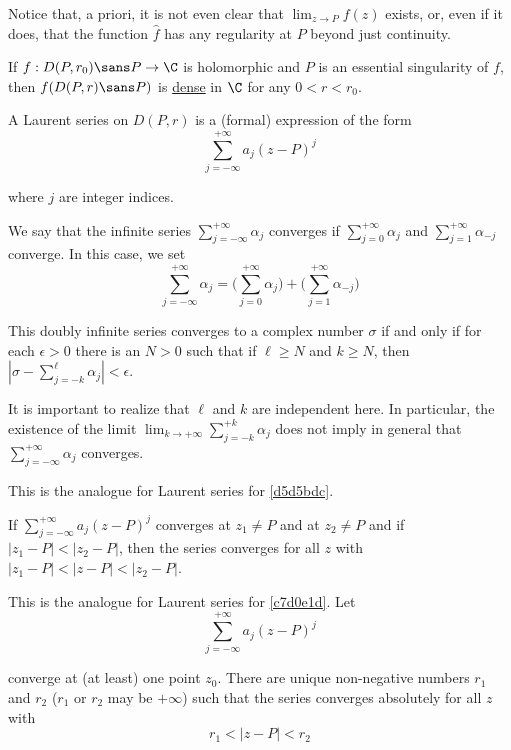 Notice that, a priori, it is not even clear that $\lim_{z\to P}f(z)$ exists,
or, even if it does, that the function $\hat f$ has any regularity at $P$
beyond just continuity.

\label{da8365b}

If $f:D(P,r_0)\sans P\to\C$ is holomorphic and $P$ is an essential singularity
of $f$, then $f(D(P,r)\sans P)$ is \href{e14819a}{dense} in $\C$ for any
$0<r<r_0$.

\label{cb20929}

A Laurent series on $D(P,r)$ is a (formal) expression of the form
$$
  \sum_{j=-\infty}^{+\infty} a_j(z-P)^j
$$

where $j$ are integer indices.

We say that the infinite series $\sum_{j=-\infty}^{+\infty}\alpha_j$ converges
if $\sum_{j=0}^{+\infty}\alpha_j$ and $\sum_{j=1}^{+\infty}\alpha_{-j}$
converge. In this case, we set
$$
  \sum_{j=-\infty}^{+\infty}\alpha_j=
  \biggl(\sum_{j=0}^{+\infty}\alpha_j\biggr)+
  \biggl(\sum_{j=1}^{+\infty}\alpha_{-j}\biggr)
$$

This doubly infinite series converges to a complex number $\sigma$ if and only
if for each $\epsilon>0$ there is an $N>0$ such that if $\ell\geq N$ and $k\geq
N$, then $|\sigma-\sum_{j=-k}^\ell\alpha_j|<\epsilon$.

It is important to realize that $\ell$ and $k$ are independent here. In
particular, the existence of the limit
$\lim_{k\to+\infty}\sum_{j=-k}^{+k}\alpha_j$ does not imply in general that
$\sum_{j=-\infty}^{+\infty}\alpha_j$ converges.

\Lemma{}\label{d5253d9}

This is the analogue for Laurent series for \autoref{d5d5bdc}.

If $\sum_{j=-\infty}^{+\infty}a_j(z-P)^j$ converges at $z_1\neq P$ and at
$z_2\neq P$ and if $|z_1-P|<|z_2-P|$, then the series converges for all $z$
with $|z_1-P|<|z-P|<|z_2-P|$.

\Lemma{}\label{a9a7710}

This is the analogue for Laurent series for \autoref{c7d0e1d}. Let
$$
  \sum_{j=-\infty}^{+\infty}a_j(z-P)^j
$$

converge at (at least) one point $z_0$. There are unique non-negative numbers
$r_1$ and $r_2$ ($r_1$ or $r_2$ may be $+\infty$) such that the series
converges absolutely for all $z$ with
$$
  r_1<|z-P|<r_2
$$

